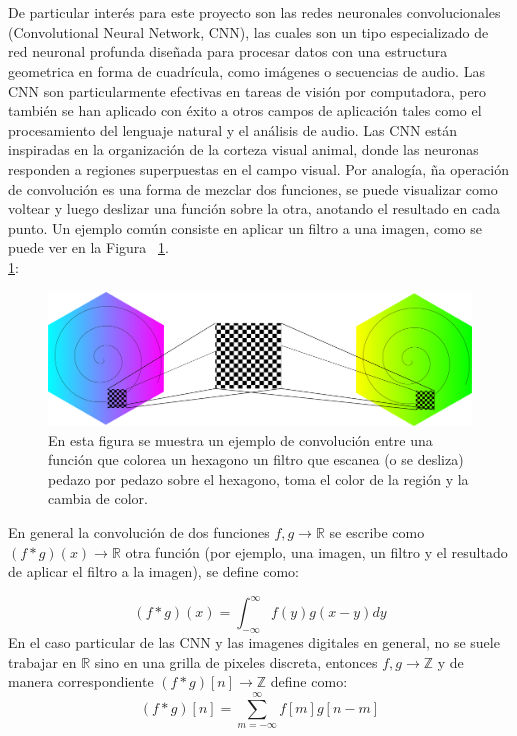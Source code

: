 \documentclass[12pt,letterpaper,final, openany]{scrbook}
\begin{document}
\\
\\
De particular interés para este proyecto son las redes neuronales convolucionales (Convolutional Neural Network, CNN), las cuales son un tipo especializado de red neuronal profunda diseñada para procesar datos con una estructura geometrica en forma de cuadrícula, como imágenes o secuencias de audio. Las CNN son particularmente efectivas en tareas de visión por computadora, pero también se han aplicado con éxito a otros campos de aplicación tales como el procesamiento del lenguaje natural y el análisis de audio. Las CNN están inspiradas en la organización de la corteza visual animal, donde las neuronas responden a regiones superpuestas en el campo visual. Por analogía, ña operación de convolución es una forma de mezclar dos funciones, se puede visualizar como voltear y luego deslizar una función sobre la otra, anotando el resultado en cada punto. Un ejemplo común consiste en aplicar un filtro a una imagen, como se puede ver en la Figura ~\ref{fig:convolution}.
\\
\ref{fig:convolution}:
\begin{figure}[h!]
\includegraphics[width=1\textwidth]{convolution.png}
\caption{En esta figura se muestra un ejemplo de convolución entre una función que colorea un hexagono un filtro que escanea (o se desliza) pedazo por pedazo sobre el hexagono, toma el color de la región y la cambia de color.}
\label{fig:convolution}
\end{figure}


En general la convolución de dos funciones $f,g \rightarrow \mathbb{R}$ se escribe como $(f*g)(x) \rightarrow \mathbb{R}$ otra función (por ejemplo, una imagen, un filtro y el resultado de aplicar el filtro a la imagen),  se define como:

\begin{equation}
(f * g)(x) = \int_{-\infty}^{\infty} f(y)g(x-y)dy
\end{equation}
En el caso particular de las CNN y las imagenes digitales en general, no se suele trabajar en $\mathbb{R}$ sino en una grilla de pixeles discreta, entonces $f,g \rightarrow \mathbb{Z}$ y de manera correspondiente $(f*g)[n] \rightarrow \mathbb{Z}$ define como:
\begin{equation}
(f * g)[n] = \sum_{m=-\infty}^{\infty} f[m]g[n-m]
\end{equation}
\end{document}
